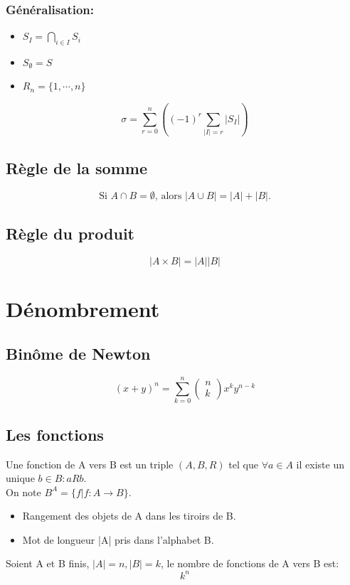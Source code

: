 \subsubsection*{Généralisation:}
\begin{itemize}
\item $S_I = \bigcap_{i \in I} S_i$
\item $S_{\emptyset} = S$
\item $R_n = \{1, \cdots , n\}$
\end{itemize}
\[ \sigma = \sum_{r = 0}^n\left ( (-1)^r \sum_{|I| = r}|S_I| \right ) \]

\subsection{Règle de la somme}
\[ \text{Si }A \cap B = \emptyset \text{, alors }|A \cup B| = |A| + |B| \text{.} \]
\subsection{Règle du produit}
\[ |A \times B| = |A||B| \]
\section{Dénombrement}
\subsection{Binôme de Newton}
\[ (x + y)^n = \sum_{k = 0}^n \begin{pmatrix}  n  \\ k \end{pmatrix} x^ky^{n-k} \]
\subsection{Les fonctions}
Une fonction de A vers B est un triple $(A,B,R)$ tel que $\forall a \in A$ il existe un unique $b \in B : aRb$.\\

On note $B^{A} = \{f | f : A \rightarrow B\}$.\\

\begin{itemize}
\item Rangement des objets de A dans les tiroirs de B.\\
\item Mot de longueur |A| pris dans l'alphabet B.\\
\end{itemize}
Soient A et B finis, $|A| = n , |B| = k$, le nombre de fonctions de A vers B est:
\[ k^n \]

